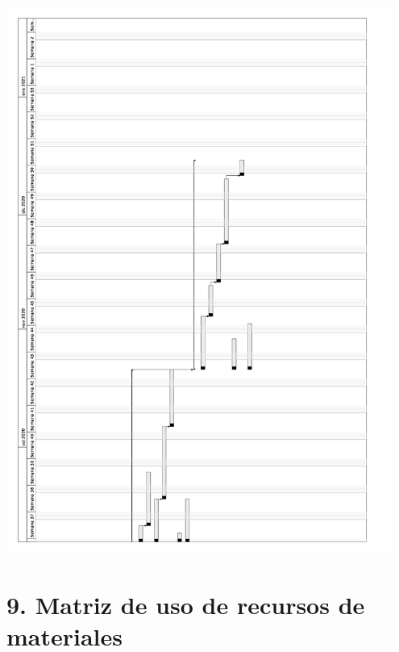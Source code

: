 \documentclass[11pt]{charter}
\begin{document}
\begin{center}
\includegraphics[width=0.95\textwidth, angle=180]{./Figuras/gantt-1.jpg}
\label{fig:gantt}
\end{center}

\section{9. Matriz de uso de recursos de materiales}
\label{sec:recursos}
\end{document}

